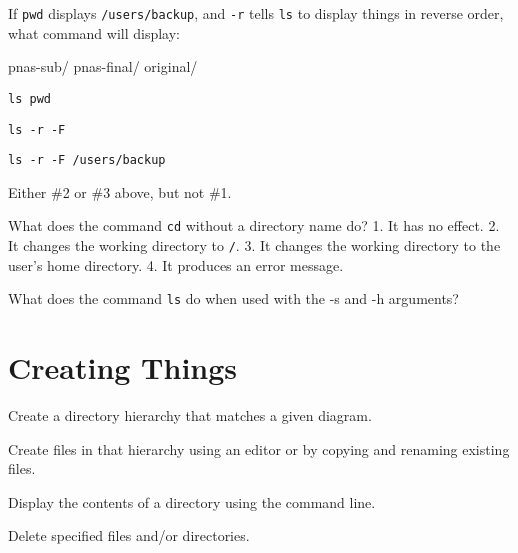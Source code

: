 \documentclass{book}
\begin{document}
\begin{challenge}

  If \texttt{pwd} displays \texttt{/users/backup}, and \texttt{-r} tells
  \texttt{ls} to display things in reverse order, what command will
  display:

\begin{VerbOut}
pnas-sub/ pnas-final/ original/
\end{VerbOut}

\begin{swcenumerate}
\item
  \texttt{ls pwd}
\item
  \texttt{ls -r -F}
\item
  \texttt{ls -r -F /users/backup}
\item
  Either \#2 or \#3 above, but not \#1.
\end{swcenumerate}

\end{challenge}

\begin{challenge}

  What does the command \texttt{cd} without a directory name do? 1. It has
  no effect. 2. It changes the working directory to \texttt{/}. 3. It
  changes the working directory to the user's home directory. 4. It
  produces an error message.

\end{challenge}

\begin{challenge}

  What does the command \texttt{ls} do when used with the -s and -h
  arguments?

\end{challenge}

\section{Creating Things}

\begin{objectives}
\begin{swcitemize}
\item
  Create a directory hierarchy that matches a given diagram.
\item
  Create files in that hierarchy using an editor or by copying and
  renaming existing files.
\item
  Display the contents of a directory using the command line.
\item
  Delete specified files and/or directories.
\end{swcitemize}
\end{objectives}
\end{document}
